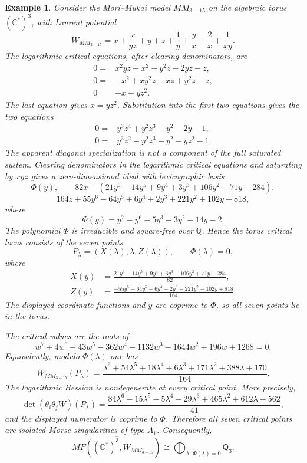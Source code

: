 \documentclass[11pt]{amsart}
\newtheorem{example}{Example}[section]
\newcommand{\MorseCat}[1]{\mathsf{Q}_{#1}}
\begin{document}
\begin{example}
Consider the Mori--Mukai model $MM_{3-15}$ on the algebraic torus
$(\mathbb{C}^*)^3$, with Laurent potential
\[
W_{MM_{3-15}}=x+\frac{x}{yz}+y+z+\frac{1}{y}
+\frac{y}{x}+\frac{2}{x}+\frac{1}{xy}.
\]
The logarithmic critical equations, after clearing denominators, are
\begin{align*}
0={}&x^2yz+x^2-y^2z-2yz-z, \\
0={}&-x^2+xy^2z-xz+y^2z-z, \\
0={}&-x+yz^2.
\end{align*}
The last equation gives $x=yz^2$. Substitution into the first two equations
gives the two equations
\begin{align*}
0={}&y^3z^4+y^2z^3-y^2-2y-1, \\
0={}&y^3z^2-y^2z^3+y^2-yz^2-1.
\end{align*}
The apparent diagonal specialization is not a component of the full saturated
system. Clearing denominators in the logarithmic critical equations and
saturating by $xyz$ gives a zero-dimensional ideal with lexicographic basis
\[
\Phi(y),
\qquad
82x-(21y^6-14y^5+9y^4+3y^3+106y^2+71y-284),
\]
\[
164z+55y^6-64y^5+6y^4+2y^3+221y^2+102y-818,
\]
where
\[
\Phi(y)=y^7-y^6+5y^3+3y^2-14y-2.
\]
The polynomial $\Phi$ is irreducible and square-free over $\mathbb{Q}$. Hence
the torus critical locus consists of the seven points
\[
P_\lambda=(X(\lambda),\lambda,Z(\lambda)),
\qquad
\Phi(\lambda)=0,
\]
where
\begin{align*}
X(y)&=\frac{21y^6-14y^5+9y^4+3y^3+106y^2+71y-284}{82}, \\
Z(y)&=\frac{-55y^6+64y^5-6y^4-2y^3-221y^2-102y+818}{164}.
\end{align*}
The displayed coordinate functions and $y$ are coprime to $\Phi$, so all seven
points lie in the torus.

The critical values are the roots of
\[
w^7+4w^6-43w^5-362w^4-1132w^3-1644w^2+196w+1268=0.
\]
Equivalently, modulo $\Phi(\lambda)$ one has
\[
W_{MM_{3-15}}(P_\lambda)=
\frac{\lambda^6+54\lambda^5+18\lambda^4+6\lambda^3
+171\lambda^2+388\lambda+170}{164}.
\]
The logarithmic Hessian is nondegenerate at every critical point. More
precisely,
\[
\det(\theta_i\theta_jW)(P_\lambda)
=\frac{84\lambda^6-15\lambda^5-5\lambda^4-29\lambda^3
+465\lambda^2+612\lambda-562}{41},
\]
and the displayed numerator is coprime to $\Phi$. Therefore all seven critical
points are isolated Morse singularities of type $A_1$. Consequently,
\[
\overline{MF((\mathbb{C}^*)^3,W_{MM_{3-15}})}
\cong \bigoplus_{\lambda:\,\Phi(\lambda)=0}\MorseCat{3}.
\]
\end{example}
\end{document}
